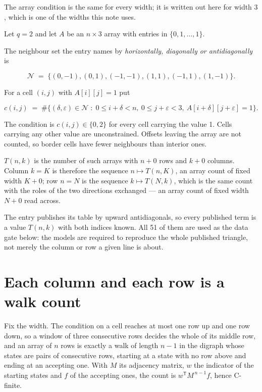 \documentclass[11pt]{article}
\theoremstyle{definition}
\begin{document}
The array condition is the same for every width; it is written out here for width $3$, which is one of the widths this note uses.

Let $q = 2$ and let $A$ be an $n \times 3$ array with entries in $\{0,1,\dots,1\}$.

The neighbour set the entry names by {\itshape horizontally, diagonally or antidiagonally} is

\[\mathcal{N} \;=\; \{(0,-1), (0,1), (-1,-1), (1,1), (-1,1), (1,-1)\}.\]

For a cell $(i,j)$ with $A[i][j] = 1$ put

\[c(i,j) \;=\; \#\bigl\{(\delta,\varepsilon)\in\mathcal{N} \;:\; 0\le i+\delta<n,\ 0\le j+\varepsilon<3,\ A[i+\delta][j+\varepsilon] = 1\bigr\}.\]

The condition is $c(i,j) \in \{0, 2\}$ for every cell carrying the value 1. Cells carrying any other value are unconstrained. Offsets leaving the array are not counted, so border cells have fewer neighbours than interior ones.

$T(n,k)$ is the number of such arrays with $n + 0$ rows and $k + 0$ columns. Column $k = K$ is therefore the sequence $n \mapsto T(n,K)$, an array count of fixed width $K + 0$; row $n = N$ is the sequence $k \mapsto T(N,k)$, which is the same count with the roles of the two directions exchanged --- an array count of fixed width $N + 0$ read across.

The entry publishes its table by upward antidiagonals, so every published term is a value $T(n,k)$ with both indices known. All 51 of them are used as the data gate below: the models are required to reproduce the whole published triangle, not merely the column or row a given line is about.

\section{Each column and each row is a walk count}

Fix the width. The condition on a cell reaches at most one row up and one row down, so a window of three consecutive rows decides the whole of its middle row, and an array of $n$ rows is exactly a walk of length $n-1$ in the digraph whose states are pairs of consecutive rows, starting at a state with no row above and ending at an accepting one. With $M$ its adjacency matrix, $w$ the indicator of the starting states and $f$ of the accepting ones, the count is $w^{\mathsf T}M^{\,n-1}f$, hence C-finite.
\end{document}
